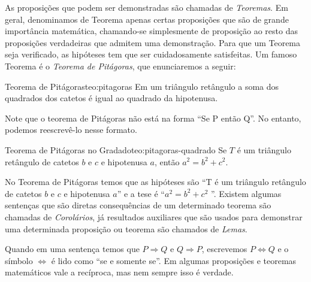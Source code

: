 As proposições que podem ser demonstradas são chamadas de \emph{Teoremas}.
Em geral, denominamos de Teorema apenas certas proposições que são de grande
importância matemática, chamando-se simplesmente de proposição ao resto das
proposições verdadeiras que admitem uma demonstração. Para que um Teorema seja
verificado, as hipóteses tem que ser cuidadosamente satisfeitas. Um famoso
Teorema é o \emph{Teorema de Pitágoras}, que enunciaremos a seguir:

\begin{teorema}{Teorema de Pitágoras}{teo:pitagoras}
  Em um triângulo retângulo a
  soma dos quadrados dos catetos é igual ao quadrado da hipotenusa.
\end{teorema}

Note que o teorema de Pitágoras não está na forma ``Se P então Q''. No entanto,
podemos reescrevê-lo nesse formato.

\begin{teorema}{Teorema de Pitágoras no Gradado}{teo:pitagoras-quadrado}
  Se $T$ é um triângulo retângulo
  de catetos $b$ e $c$ e hipotenusa $a$, então $a^2=b^2+c^2$.
\end{teorema}

No Teorema de Pitágoras temos que as hipóteses são ``T é um triângulo retângulo
de catetos $b$ e $c$ e hipotenusa $a$'' e a tese é ``$a^2=b^2+c^2$ ''. Existem
algumas sentenças que são diretas consequências de um determinado teorema são
chamadas de \emph{Corolários}, já resultados auxiliares que são usados para
demonstrar uma determinada proposição ou teorema são chamados de
\emph{Lemas}.

Quando em uma sentença temos que $P \Rightarrow Q$ e $Q \Rightarrow P$,
escrevemos $P \Leftrightarrow Q$ e o símbolo $\Leftrightarrow$ é lido como ``se
e somente se''. Em algumas proposições e teoremas matemáticos vale a recíproca,
mas nem sempre isso é verdade.

